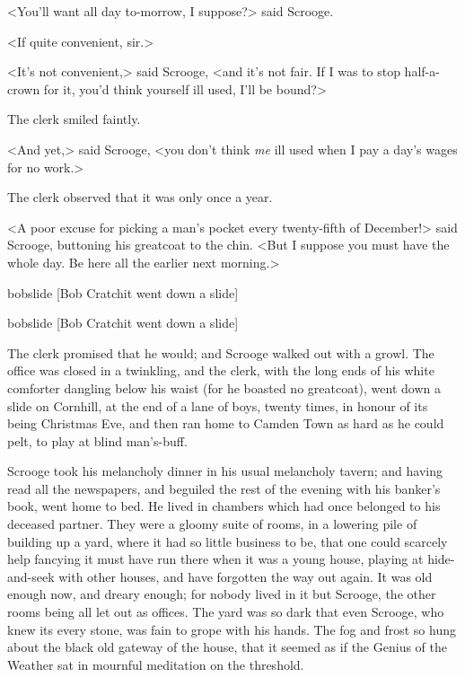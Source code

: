 <You'll want all day to-morrow, I suppose?> said Scrooge.

<If quite convenient, sir.>

<It's not convenient,> said Scrooge, <and it's not fair. If I was to stop
half-a-crown for it, you'd think yourself ill used, I'll be bound?>

The clerk smiled faintly.

<And yet,> said Scrooge, <you don't think \emph{me} ill used when I pay a day's
wages for no work.>

The clerk observed that it was only once a year.

<A poor excuse for picking a man's pocket every twenty-fifth of December!> said
Scrooge, buttoning his greatcoat to the chin. <But I suppose you must have the
whole day. Be here all the earlier next morning.>


\begin{folio}
  \begin{colorbigpic}
    [\basicscale] 
    {bobslide}
    [Bob Cratchit went down a slide]
  \end{colorbigpic}
\end{folio}

\begin{quarto}
  \begin{colorbigpic}
    [1.0] 
    {bobslide}
    [Bob Cratchit went down a slide]
  \end{colorbigpic}
\end{quarto}

The clerk promised that he would; and Scrooge walked out with a growl. The
office was closed in a twinkling, and the clerk, with the long ends of his white
comforter dangling below his waist (for he boast\-ed no greatcoat), went down a
slide on Cornhill, at the end of a lane of boys, twenty times, in honour of its
being Christmas Eve, and then ran home to Camden Town as hard as he could pelt,
to play at blind man's-buff.

Scrooge took his melancholy dinner in his usual melancholy tavern; and having
read all the newspapers, and beguiled the rest of the evening with his banker's
book, went home to bed. He lived in chambers which had once belonged to his
deceased partner. They were a gloomy suite of rooms, in a lowering pile of
building up a yard, where it had so little business to be, that one could
scarcely help fancying it must have run there when it was a young house, playing
at hide-and-seek with other houses, and have forgotten the way out again. It was
old enough now, and dreary enough; for nobody lived in it but Scrooge, the other
rooms being all let out as offices. The yard was so dark that even Scrooge, who
knew its every stone, was fain to grope with his hands. The fog and frost so
hung about the black old gateway of the house, that it seemed as if the Genius
of the Weather sat in mournful meditation on the threshold.

